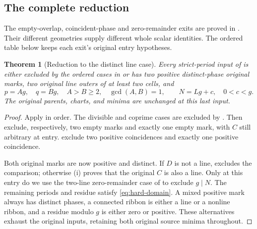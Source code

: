 \documentclass[11pt,a4paper]{amsart}
\numberwithin{equation}{section}
\theoremstyle{plain}
\newtheorem{theorem}{Theorem}[section]
\theoremstyle{definition}
\begin{document}
\subsection{The complete reduction}

The empty-overlap, coincident-phase and zero-remainder exits are proved
in .  Their different geometries supply
different whole scalar identities.  The ordered table below keeps each
exit's original entry hypotheses.

\begin{theorem}[Reduction to the distinct line case]\label{thm:reduction}
Every strict-period input of  is either excluded by the
ordered cases in  or has two positive distinct-phase original marks,
two original line outers of at least two cells, and
\begin{equation}\label{eq:hard-domain}
 p=Ag,\quad q=Bg,\quad A>B\ge2,\quad\gcd(A,B)=1,
 \qquad N=Lg+c,\quad0<c<g.
\end{equation}
The original parents, charts, and minima are unchanged at this last input.
\end{theorem}
\begin{proof}
Apply  in order.  The divisible and coprime cases are
excluded by .
Then  exclude, respectively,
two empty marks and exactly one empty mark, with \(C\) still arbitrary
at entry.   exclude two
positive coincidences and exactly one positive coincidence.

Both original marks are now positive and distinct.  If \(D\) is not a
line,  excludes the comparison; otherwise
(i) proves that the original \(C\) is also a line.
Only at this entry do we use the two-line zero-remainder case of
 to exclude \(g\mid N\).
The remaining periods and residue satisfy \eqref{eq:hard-domain}.
A mixed positive mark always has distinct phases, a connected ribbon
is either a line or a nonline ribbon, and a residue modulo \(g\) is
either zero or positive.  These alternatives exhaust the original
inputs, retaining both original source minima throughout.
\end{proof}
\end{document}

